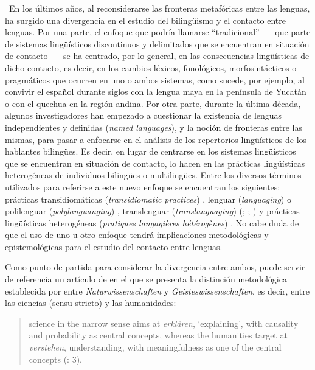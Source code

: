\documentclass[output=paper]{langscibook}
\begin{document}
~En los últimos años, al reconsiderarse las fronteras metafóricas entre las lenguas, ha surgido una divergencia en el estudio del bilingüismo y el contacto entre lenguas. Por una parte, el enfoque que podría llamarse “tradicional” –– que parte de sistemas lingüísticos discontinuos y delimitados que se encuentran en situación de contacto –– se ha centrado, por lo general, en las consecuencias lingüísticas de dicho contacto, es decir, en los cambios léxicos, fonológicos, morfosintácticos o pragmáticos que ocurren en uno o ambos sistemas, como sucede, por ejemplo, al convivir el español durante siglos con la lengua maya en la península de Yucatán o con el quechua en la región andina. Por otra parte, durante la última década, algunos investigadores han empezado a cuestionar la existencia de lenguas independientes y definidas (\emph {named languages}), y la noción de fronteras entre las mismas, para pasar a enfocarse en el análisis de los repertorios lingüísticos de los hablantes bilingües. Es decir, en lugar de centrarse en los sistemas lingüísticos que se encuentran en situación de contacto, lo hacen en las prácticas lingüísticas heterogéneas de individuos bilingües o multilingües. Entre los diversos términos utilizados para referirse a este nuevo enfoque se encuentran los siguientes: prácticas transidiomáticas (\emph {transidiomatic practices}) \citep{Jacquemet2005}, lenguar (\emph {languaging}) o polilenguar (\emph {polylanguanging}) \citep{JørgensenEtAl2011}, translenguar (\emph {translanguaging}) (\citealt{García2009}; \citealt{GarcíaWei2014}; \citealt{CreeseBlackledge2010}) y prácticas lingüísticas heterogéneas (\textit{pratiques langagières hétérogènes}) \citep{Léglise2013}. No cabe duda de que el uso de uno u otro enfoque tendrá implicaciones metodológicas y epistemológicas para el estudio del contacto entre lenguas.

Como punto de partida para considerar la divergencia entre ambos, puede servir de referencia un artículo de  \citet{GuyHinskens2016} en el que se presenta la distinción metodológica establecida por \citet{Dilthey1883} entre \emph {Naturwissenschaften} y \emph {Geisteswissenschaften}, es decir, entre las ciencias (sensu stricto) y las humanidades:

\begin{quote}
science in the narrow sense aims at \emph {erklären}, ‘explaining’, with causality and probability as central concepts, whereas the humanities target at \emph {verstehen}, understanding, with meaningfulness as one of the central concepts (\citealt{GuyHinskens2016}: 3). 
\end{quote}
\end{document}
